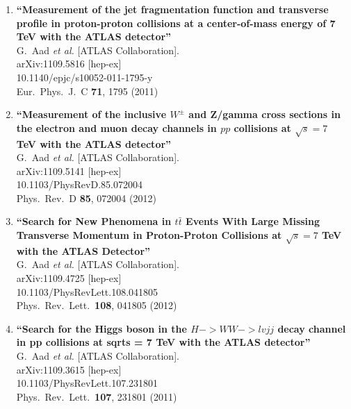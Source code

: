\documentclass{article}
\begin{document}
\begin{enumerate}
\item%
{\bf ``Measurement of the jet fragmentation function and transverse profile in proton-proton collisions at a center-of-mass energy of 7 TeV with the ATLAS detector''}
  \\{}G.~Aad {\it et al.}  [ATLAS Collaboration].
  \\{}arXiv:1109.5816 [hep-ex]
    \\{}10.1140/epjc/s10052-011-1795-y
\\{}Eur.\ Phys.\ J.\ C {\bf 71}, 1795 (2011) %


\item%
{\bf ``Measurement of the inclusive $W^\pm$ and Z/gamma cross sections in the electron and muon decay channels in $pp$ collisions at $\sqrt{s}=7$ TeV with the ATLAS detector''}
  \\{}G.~Aad {\it et al.}  [ATLAS Collaboration].
  \\{}arXiv:1109.5141 [hep-ex]
    \\{}10.1103/PhysRevD.85.072004
\\{}Phys.\ Rev.\ D {\bf 85}, 072004 (2012) %


\item%
{\bf ``Search for New Phenomena in $t\bar{t}$ Events With Large Missing Transverse Momentum in Proton-Proton Collisions at $\sqrt{s}=7$ TeV with the ATLAS Detector''}
  \\{}G.~Aad {\it et al.}  [ATLAS Collaboration].
  \\{}arXiv:1109.4725 [hep-ex]
    \\{}10.1103/PhysRevLett.108.041805
\\{}Phys.\ Rev.\ Lett.\  {\bf 108}, 041805 (2012) %


\item%
{\bf ``Search for the Higgs boson in the $H -> WW -> lvjj$ decay channel in pp collisions at sqrt{s} = 7 TeV with the ATLAS detector''}
  \\{}G.~Aad {\it et al.}  [ATLAS Collaboration].
  \\{}arXiv:1109.3615 [hep-ex]
    \\{}10.1103/PhysRevLett.107.231801
\\{}Phys.\ Rev.\ Lett.\  {\bf 107}, 231801 (2011) %



\end{enumerate}
\end{document}
